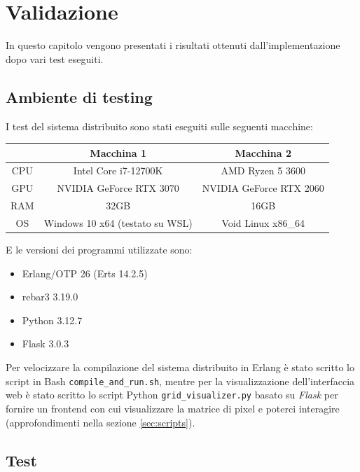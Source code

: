 \documentclass[12pt, a4paper]{report}
\begin{document}
\chapter{Validazione}

In questo capitolo vengono presentati i risultati ottenuti dall'implementazione dopo vari test eseguiti.

\section{Ambiente di testing}

I test del sistema distribuito sono stati eseguiti sulle seguenti macchine:

\begin{table}[H]
    \centering
    \begin{tabular}{c||c|c}
        & Macchina 1 & Macchina 2 \\
        \hline
        CPU & Intel Core i7-12700K & AMD Ryzen 5 3600 \\
        GPU & NVIDIA GeForce RTX 3070 & NVIDIA GeForce RTX 2060 \\
        RAM & 32GB & 16GB \\
        OS & Windows 10 x64 (testato su WSL) & Void Linux x86\_64 \\
    \end{tabular}
    \label{tab:env}
\end{table}


E le versioni dei programmi utilizzate sono:

\begin{itemize}
    \item Erlang/OTP 26 (Erts 14.2.5)
    \item rebar3 3.19.0
    \item Python 3.12.7
    \item Flask 3.0.3
\end{itemize}

Per velocizzare la compilazione del sistema distribuito in Erlang \`e stato scritto lo script in Bash \texttt{compile\_and\_run.sh}, mentre per la visualizzazione dell'interfaccia web \`e stato scritto lo script Python \texttt{grid\_visualizer.py} basato su \textit{Flask} per fornire un frontend con cui visualizzare la matrice di pixel e poterci interagire (approfondimenti nella sezione \ref{sec:scripts}).

\section{Test}
\end{document}

